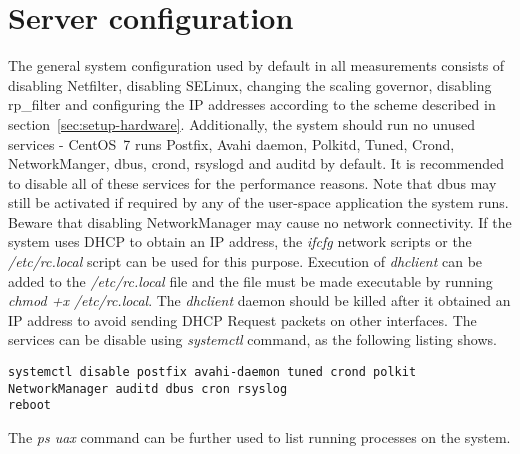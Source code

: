 
\section{Server configuration}\label{sec:setup-server}
The general system configuration used by default in all measurements
consists of disabling Netfilter, disabling SELinux, changing the scaling governor, disabling rp\_filter and
configuring the IP addresses according to the scheme described in section~\ref{sec:setup-hardware}.
Additionally, the system should run no unused services - CentOS~7 runs Postfix, Avahi daemon, Polkitd, Tuned, Crond,
NetworkManger, dbus, crond, rsyslogd and auditd by default.
It is recommended to disable all of these services for the performance reasons.
Note that dbus may still be activated if required by any of the user-space application the system runs.
Beware that disabling NetworkManager may cause no network connectivity.
If the system uses DHCP to obtain an IP address, the {\it{ifcfg}} network scripts or
the {\it{/etc/rc.local}} script can be used for this purpose.
Execution of {\it{dhclient}} can be added to the {\it{/etc/rc.local}} file and
the file must be made executable by running {\it{chmod +x /etc/rc.local}}.
The {\it{dhclient}} daemon should be killed after it obtained an IP address
to avoid sending DHCP Request packets on other interfaces.
The services can be disable using {\it{systemctl}} command, as the following listing shows.
\newpage
\begin{lstlisting}
systemctl disable postfix avahi-daemon tuned crond polkit NetworkManager auditd dbus cron rsyslog
reboot
\end{lstlisting}
The {\it{ps uax}} command can be further used to list running processes on the system.
\\

